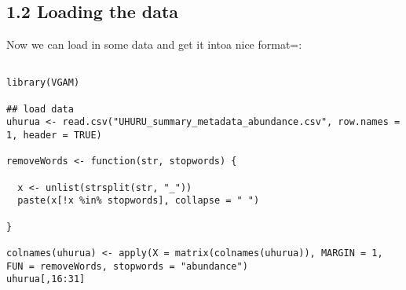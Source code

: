 \documentclass[11pt]{article}
\begin{document}
\subsection*{1.2 Loading the data}
\label{sec:org86e7f59}

Now we can load in some data and get it intoa nice format=:

\begin{verbatim}

library(VGAM)

## load data
uhurua <- read.csv("UHURU_summary_metadata_abundance.csv", row.names = 1, header = TRUE)

removeWords <- function(str, stopwords) {

  x <- unlist(strsplit(str, "_"))
  paste(x[!x %in% stopwords], collapse = " ")

}

colnames(uhurua) <- apply(X = matrix(colnames(uhurua)), MARGIN = 1, FUN = removeWords, stopwords = "abundance")
uhurua[,16:31]

\end{verbatim}
\end{document}
